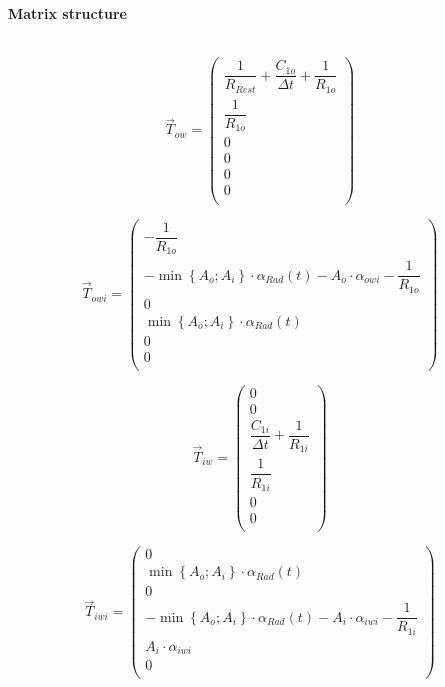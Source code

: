 \begin{huge}
\textbf{Matrix structure}
\end{huge}
\vspace{\spacing}
\\
\begin{equation}
\vec{T}_{ow} = 
\begin{pmatrix} 
	\dfrac{1}{R_{Rest}} + \dfrac{C_{1o}}{\Delta t} + \dfrac{1}{R_{1o}} \\
	\dfrac{1}{R_{1o}} \\
	0 \\
	0 \\
	0 \\
	0 \\
\end{pmatrix}
\end{equation}

\begin{equation}
\vec{T}_{owi} = 
\begin{pmatrix} 
	-\dfrac{1}{R_{1o}} \\
	-\min\left\lbrace A_o;A_i \right\rbrace \cdot \alpha_{Rad}(t)-A_o \cdot \alpha_{owi} - \dfrac{1}{R_{1o}} \\
	0 \\
	\min\left\lbrace A_o;A_i \right\rbrace \cdot \alpha_{Rad}(t) \\
	0 \\
	0 \\
\end{pmatrix}
\end{equation}

\begin{equation}
\vec{T}_{iw} = 
\begin{pmatrix} 
	0 \\
	0 \\
	\dfrac{C_{1i}}{\Delta t} + \dfrac{1}{R_{1i}} \\
	\dfrac{1}{R_{1i}} \\
	0 \\
	0 \\
\end{pmatrix}
\end{equation}

\begin{equation}
\vec{T}_{iwi} = 
\begin{pmatrix} 
	0 \\
	\min\left\lbrace A_o;A_i \right\rbrace \cdot \alpha_{Rad}(t) \\
	0 \\
	-\min\left\lbrace A_o;A_i \right\rbrace \cdot \alpha_{Rad}(t) - A_i \cdot \alpha_{iwi} - \dfrac{1}{R_{1i}} \\
	A_i \cdot \alpha_{iwi} \\
	0 \\
\end{pmatrix}
\end{equation}

